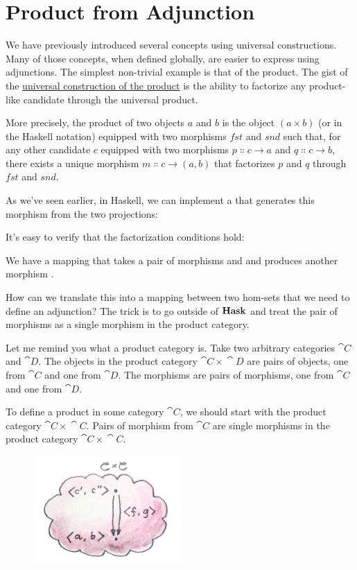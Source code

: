 \section{Product from Adjunction}

We have previously introduced several concepts using universal
constructions. Many of those concepts, when defined globally, are easier
to express using adjunctions. The simplest non-trivial example is that
of the product. The gist of the \hyperref[products-and-coproducts]{universal
  construction of the product} is the ability to factorize any
product-like candidate through the universal product.

More precisely, the product of two objects $a$ and $b$ is
the object $(a\times{}b)$ (or  in the Haskell
notation) equipped with two morphisms $fst$ and $snd$ such
that, for any other candidate $c$ equipped with two morphisms
$p \Colon c \to a$ and $q \Colon c \to b$, there
exists a unique morphism $m \Colon c \to (a, b)$ that
factorizes $p$ and $q$ through $fst$ and $snd$.

As we've seen earlier, in Haskell, we can implement a  that generates this
morphism from the two projections:

It's easy to verify that the factorization conditions hold:

We have a mapping that takes a pair of morphisms  and
 and produces another morphism
.

How can we translate this into a mapping between two hom-sets that we
need to define an adjunction? The trick is to go outside of
$\mathbf{Hask}$ and treat the pair of morphisms as a single morphism in
the product category.

Let me remind you what a product category is. Take two arbitrary
categories $\cat{C}$ and $\cat{D}$. The objects in the product category
$\cat{C}\times{}\cat{D}$ are pairs of objects, one from $\cat{C}$ and one from
$\cat{D}$. The morphisms are pairs of morphisms, one from $\cat{C}$ and
one from $\cat{D}$.

To define a product in some category $\cat{C}$, we should start with the
product category $\cat{C}\times{}\cat{C}$. Pairs of morphism from $\cat{C}$ are single
morphisms in the product category $\cat{C}\times{}\cat{C}$.

\begin{figure}[H]
  \centering
  \includegraphics[width=0.5\textwidth]{images/adj-productcat.jpg}
\end{figure}

